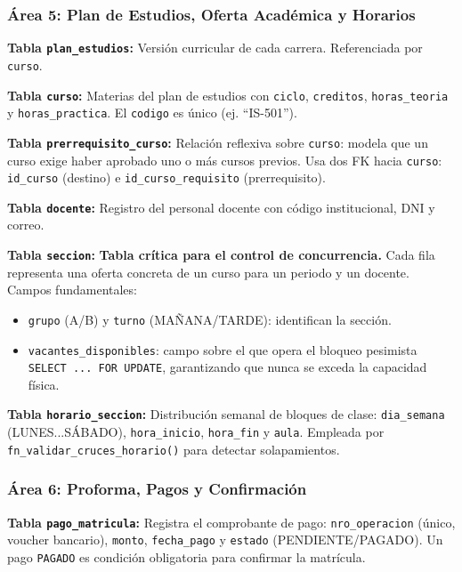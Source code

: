 \documentclass[12pt,a4paper]{article}
\begin{document}
\subsubsection{\'Area 5: Plan de Estudios, Oferta Acad\'emica y Horarios}

\textbf{Tabla \texttt{plan\_estudios}:} Versi\'on curricular de cada carrera. Referenciada por \texttt{curso}.

\textbf{Tabla \texttt{curso}:} Materias del plan de estudios con \texttt{ciclo}, \texttt{creditos}, \texttt{horas\_teoria} y \texttt{horas\_practica}. El \texttt{codigo} es \'unico (ej. ``IS-501'').

\textbf{Tabla \texttt{prerrequisito\_curso}:} Relaci\'on reflexiva sobre \texttt{curso}: modela que un curso exige haber aprobado uno o m\'as cursos previos. Usa dos FK hacia \texttt{curso}: \texttt{id\_curso} (destino) e \texttt{id\_curso\_requisito} (prerrequisito).

\textbf{Tabla \texttt{docente}:} Registro del personal docente con c\'odigo institucional, DNI y correo.

\textbf{Tabla \texttt{seccion}:} \textbf{Tabla cr\'itica para el control de concurrencia.} Cada fila representa una oferta concreta de un curso para un periodo y un docente. Campos fundamentales:
\begin{itemize}
  \item \texttt{grupo} (A/B) y \texttt{turno} (MA\~NANA/TARDE): identifican la secci\'on.
  \item \texttt{vacantes\_disponibles}: campo sobre el que opera el bloqueo pesimista \texttt{SELECT ... FOR UPDATE}, garantizando que nunca se exceda la capacidad f\'isica.
\end{itemize}

\textbf{Tabla \texttt{horario\_seccion}:} Distribuci\'on semanal de bloques de clase: \texttt{dia\_semana} (LUNES...S\'ABADO), \texttt{hora\_inicio}, \texttt{hora\_fin} y \texttt{aula}. Empleada por \texttt{fn\_validar\_cruces\_horario()} para detectar solapamientos.

\subsubsection{\'Area 6: Proforma, Pagos y Confirmaci\'on}

\textbf{Tabla \texttt{pago\_matricula}:} Registra el comprobante de pago: \texttt{nro\_operacion} (\'unico, voucher bancario), \texttt{monto}, \texttt{fecha\_pago} y \texttt{estado} (PENDIENTE/PAGADO). Un pago \texttt{PAGADO} es condici\'on obligatoria para confirmar la matr\'icula.
\end{document}
